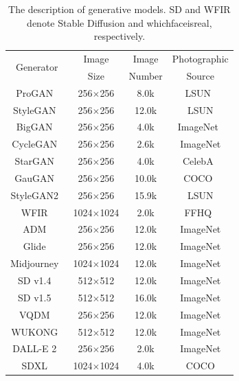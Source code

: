 \documentclass[lettersize,journal]{IEEEtran}
\begin{document}
\begin{table}[t]
\caption{The description of generative models. SD and WFIR denote Stable Diffusion and whichfaceisreal, respectively.}
\label{tab:aigcdetectbenchmark}
\centering
\scriptsize
\renewcommand{\arraystretch}{1.04}
\setlength{\tabcolsep}{6pt}
\begin{tabular}{@{}cccc@{}}
\toprule
\multirow{2}{*}{Generator} & Image & Image & Photographic \\
 & Size & Number & Source \\
\midrule
ProGAN~\cite{karras2018progan} & 256$\times$256 & 8.0k & LSUN~\cite{yu2015lsun} \\
StyleGAN~\cite{karras2019stylegan} & 256$\times$256 & 12.0k & LSUN \\
BigGAN~\cite{brock2019biggan} & 256$\times$256 & 4.0k & ImageNet~\cite{deng2009imagenet} \\
CycleGAN~\cite{zhu2017cyclegan} & 256$\times$256 & 2.6k & ImageNet \\
StarGAN~\cite{choi2018stargan} & 256$\times$256 & 4.0k & CelebA~\cite{liu2015celeba} \\
GauGAN~\cite{park2019spade} & 256$\times$256 & 10.0k & COCO~\cite{lin2014coco} \\
StyleGAN2~\cite{karras2020stylegan2} & 256$\times$256 & 15.9k & LSUN \\
WFIR~\cite{whichfaceisreal2023} & 1024$\times$1024 & 2.0k & FFHQ~\cite{karras2019stylegan} \\
ADM~\cite{dhariwal2021diffusion} & 256$\times$256 & 12.0k & ImageNet \\
Glide~\cite{nichol2022glide} & 256$\times$256 & 12.0k & ImageNet \\
Midjourney~\cite{midjourney2023} & 1024$\times$1024 & 12.0k & ImageNet \\
SD v1.4~\cite{rombach2022ldm} & 512$\times$512 & 12.0k & ImageNet \\
SD v1.5~\cite{rombach2022ldm} & 512$\times$512 & 16.0k & ImageNet \\
VQDM~\cite{gu2022vqdm} & 256$\times$256 & 12.0k & ImageNet \\
WUKONG~\cite{wukong2023} & 512$\times$512 & 12.0k & ImageNet \\
DALL-E 2~\cite{ramesh2022dalle2} & 256$\times$256 & 2.0k & ImageNet \\
SDXL~\cite{podell2024sdxl} & 1024$\times$1024 & 4.0k & COCO \\
\bottomrule
\end{tabular}
\end{table}
\end{document}
